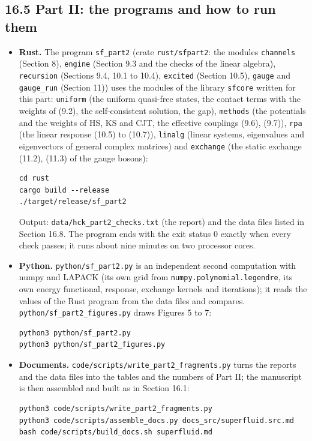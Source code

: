 \documentclass[
  10pt,
]{article}
\begin{document}
\hypertarget{part-ii-the-programs-and-how-to-run-them}{%
\subsection{16.5 Part II: the programs and how to run
them}\label{part-ii-the-programs-and-how-to-run-them}}

\begin{itemize}
\item
  \textbf{Rust.} The program \texttt{sf\_part2} (crate
  \texttt{rust/sfpart2}: the modules \texttt{channels} (Section 8),
  \texttt{engine} (Section 9.3 and the checks of the linear algebra),
  \texttt{recursion} (Sections 9.4, 10.1 to 10.4), \texttt{excited}
  (Section 10.5), \texttt{gauge} and \texttt{gauge\_run} (Section 11))
  uses the modules of the library \texttt{sfcore} written for this part:
  \texttt{uniform} (the uniform quasi-free states, the contact terms
  with the weights of (9.2), the self-consistent solution, the gap),
  \texttt{methods} (the potentials and the weights of HS, KS and CJT,
  the effective couplings (9.6), (9.7)), \texttt{rpa} (the linear
  response (10.5) to (10.7)), \texttt{linalg} (linear systems,
  eigenvalues and eigenvectors of general complex matrices) and
  \texttt{exchange} (the static exchange (11.2), (11.3) of the gauge
  bosons):

\begin{verbatim}
cd rust
cargo build --release
./target/release/sf_part2
\end{verbatim}

  Output: \texttt{data/hck\_part2\_checks.txt} (the report) and the data
  files listed in Section 16.8. The program ends with the exit status 0
  exactly when every check passes; it runs about nine minutes on two
  processor cores.
\item
  \textbf{Python.} \texttt{python/sf\_part2.py} is an independent second
  computation with numpy and LAPACK (its own grid from
  \texttt{numpy.polynomial.legendre}, its own energy functional,
  response, exchange kernels and iterations); it reads the values of the
  Rust program from the data files and compares.
  \texttt{python/sf\_part2\_figures.py} draws Figures 5 to 7:

\begin{verbatim}
python3 python/sf_part2.py
python3 python/sf_part2_figures.py
\end{verbatim}
\item
  \textbf{Documents.} \texttt{code/scripts/write\_part2\_fragments.py}
  turns the reports and the data files into the tables and the numbers
  of Part II; the manuscript is then assembled and built as in Section
  16.1:

\begin{verbatim}
python3 code/scripts/write_part2_fragments.py
python3 code/scripts/assemble_docs.py docs_src/superfluid.src.md
bash code/scripts/build_docs.sh superfluid.md
\end{verbatim}
\end{itemize}
\end{document}
